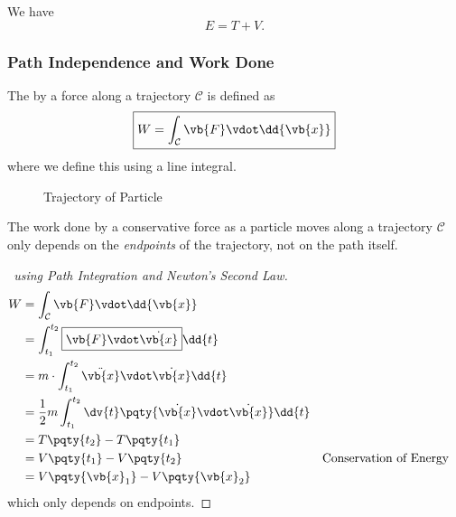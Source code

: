 We have
\begin{equation}
    E = T + V.
\end{equation}

\subsubsection{Path Independence and Work Done}

\begin{definition}
    \label{def:work-done}%
    The  by a force along a trajectory \(\mathcal{C}\) is defined as
    \begin{equation}
        \boxed{W = \int_{\mathcal{C}} \vb{F} \vdot \dd{\vb{x}}}
    \end{equation}
    where we define this using a line integral.
\end{definition}

\begin{figure}[ht!]
    \centering

    \caption{Trajectory of Particle}
    \label{fig:trajectory-of-particle}%
\end{figure}

\begin{proposition}
    \label{prop:conservative-force-path-independently}%
    The work done by a conservative force as a particle moves along a trajectory \(\mathcal{C}\) only depends on the \emph{endpoints} of the trajectory, not on the path itself.
\end{proposition}

\begin{proof}[\proofname\ using Path Integration and Newton's Second Law]
    \begin{subequations}\begin{align}
        W &= \int_{\mathcal{C}} \vb{F} \vdot \dd{\vb{x}} \\
        &= \int_{t_1}^{t_2} \boxed{\vb{F} \vdot \dot{\vb{x}}} \dd{t} \\
        &= m \cdot \int_{t_1}^{t_2} \ddot{\vb{x}} \vdot \dot{\vb{x}} \dd{t} \\
        &= \frac{1}{2} m \int_{t_1}^{t_2} \dv{t} \pqty{\dot{\vb{x}} \vdot \dot{\vb{x}}} \dd{t} \\
        &= T\pqty{t_2} - T\pqty{t_1} \\
        &= V\pqty{t_1} - V\pqty{t_2} && \text{Conservation of Energy} \\
        &= V\pqty{\vb{x}_1} - V\pqty{\vb{x}_2}
    \end{align}\end{subequations}
    which only depends on endpoints.
\end{proof}

